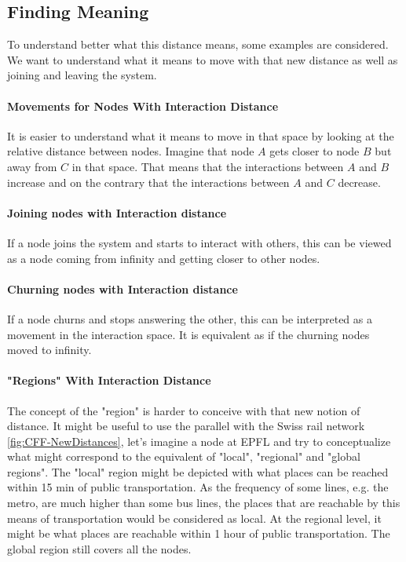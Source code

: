 \documentclass[a4paper,11pt,twoside=semi,openright]{report}
\begin{document}
\subsection{Finding Meaning}
To understand better what this distance means, some examples are
considered. We want to understand what it means to move with that new distance as
well as joining and leaving the system. 

\paragraph{Movements for Nodes With Interaction Distance}
It is easier to understand what it means to move in that space by looking at
the relative distance between nodes. Imagine that node $A$ gets closer to node
$B$ but away from $C$ in that space. That means that the interactions between
$A$ and $B$ increase and on the contrary that the interactions between $A$ and
$C$ decrease.

\paragraph{Joining nodes with Interaction distance}
If a node joins the system and starts to interact with others, this can be
viewed as a node coming from infinity and getting closer to other
nodes.

\paragraph{Churning nodes with Interaction distance}
If a node churns and stops answering the other, this can be interpreted as a
movement in the interaction space. It is equivalent as if the churning nodes moved
to infinity.  

\paragraph{"Regions" With Interaction Distance} \label{par:section-example}
The concept of the "region" is harder to conceive with that new notion of
distance. It might be useful to use the parallel with the Swiss rail network
\autoref{fig:CFF-NewDistances}, let's imagine a node at EPFL and try to
conceptualize what might correspond to the equivalent of "local", "regional"
and "global regions". The "local" region might be depicted with what places can
be reached within 15 min of public transportation. As the frequency of some
lines, e.g. the metro, are much higher than some bus lines, the places that are
reachable by this means of transportation would be considered as local. At the
regional level, it might be what places are reachable within 1 hour of public
transportation. The global region still covers all the nodes.
\end{document}
